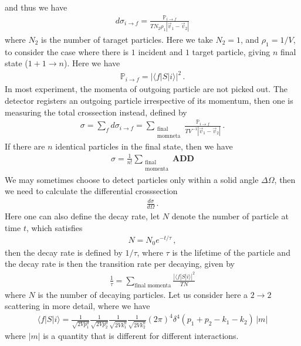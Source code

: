 \documentclass[11pt, onesided]{book}
\theoremstyle{break}
\theoremstyle{break}
\begin{document}
and thus we have
\begin{align*}
d\sigma_{i\to f} = \frac{\mathbb{P}_{i\to f}}{T N_2 \rho_1 |\vec{v}_1 - \vec{v}_2|}
\end{align*}
where $N_2$ is the number of taraget particles. Here we take $N_2 = 1$, and $\rho_1 = 1/V$, to consider the case where there is $1$ incident and $1$ target particle, giving $n$ final state ($1 + 1 \to n$). Here we have
\begin{align*}
\mathbb{P}_{i\to f} = |\langle f|S | i\rangle|^2\,.
\end{align*}
In most experiment, the momenta of outgoing particle are not picked out. The detector registers an outgoing particle irrespective of its momentum, then one is measuring the total crossection instead, defined by
\begin{align*}
\sigma = \sum_{f} d\sigma_{i\to f} = \sum_{\substack{\text{final}\\ \text{momneta}}} \frac{\mathbb{P}_{i\to f}}{TV^{-1}|\vec{v}_1 - \vec{v}_2|}\,.
\end{align*}
If there are $n$ identical particles in the final state, then we have
\begin{align*}
\sigma = \frac{1}{n!}\sum_{\substack{\text{final}\\\text{momenta}}}\textbf{ADD}
\end{align*}
We may sometimes choose to detect particles only within a solid angle $\Delta \Omega$, then we need to calculate the differential crosssection
\begin{align*}
\frac{d\sigma}{d\Omega}\,.
\end{align*}
Here one can also define the decay rate, let $N$ denote the number of particle at time $t$, which satisfies
\begin{align*}
N = N_0 e^{-t/\tau}\,,
\end{align*}
then the decay rate is defined by $1/\tau$, where $\tau$ is the lifetime of the particle and the decay rate is then the transition rate per decaying, given by
\begin{align*}
\frac{1}{\tau} = \sum_{\text{final momenta}} \frac{|\langle f|S|i\rangle|^2}{TN}
\end{align*}
where $N$ is the number of decaying particles. Let us consider here a $2\to 2$ scattering in more detail, where we have
\begin{align*}
 \langle f | S | i\rangle = \frac{1}{\sqrt{2Vp_1^0}}\frac{1}{\sqrt{2Vp_2^0}}\frac{1}{\sqrt{2Vk_1^0}}\frac{1}{\sqrt{2Vk_2^0}} (2\pi)^4 \delta^4(p_1 + p_2-k_1 -k_2)\,|m| 
\end{align*}
where $|m|$ is a quantity that is different for different interactions.\\
\end{document}
